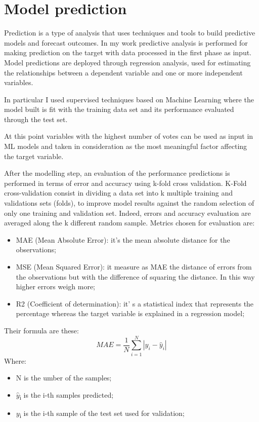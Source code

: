 \section{Model prediction}
Prediction is a type of analysis that uses techniques and tools to build predictive models and forecast outcomes. 
In my work predictive analysis is performed for making prediction on the target with data processed in the first phase as input.\newline
Model predictions are deployed through regression analysis, used for estimating the relationships between a dependent variable and one or more independent variables.\par
In particular I used supervised techniques based on Machine Learning where the model built is fit with the training data set and its performance evaluated through the test set. 
\par
At this point variables with the highest number of votes can be used as input in ML models and taken in consideration as the most meaningful factor affecting the target variable.
\par
After the modelling step, an evaluation of the performance predictions is performed in terms of error and accuracy using k-fold cross validation.\newline
K-Fold cross-validation consist in dividing a data set into k multiple training and validations sets (folds), to improve model results against the random selection of only one training and validation set. Indeed, errors and accuracy evaluation are averaged along the k different random sample.
Metrics chosen for evaluation are:
\begin{itemize}
    \item MAE (Mean Absolute Error): it's the mean absolute distance for the observations;
    \item MSE (Mean Squared Error): it measure as MAE the distance of errors from the observations but with the difference of squaring the distance. In this way higher errors weigh more;
    \item R2 (Coefficient of determination): it' s a statistical index that represents the percentage whereas the target variable is explained in a regression model;
\end{itemize} 
Their formula are these:
\begin{equation}
MAE = \frac{1}{N}\sum_{i=1}^{N}|y_i-\hat{y}_i|
\end{equation}
Where:
\begin{itemize}
    \item N is the umber of the samples;
    \item $\hat{y}$\textsubscript{i} is the i-th samples predicted;
    \item $y$\textsubscript{i} is the i-th sample of the test set used for validation;
\end{itemize}
